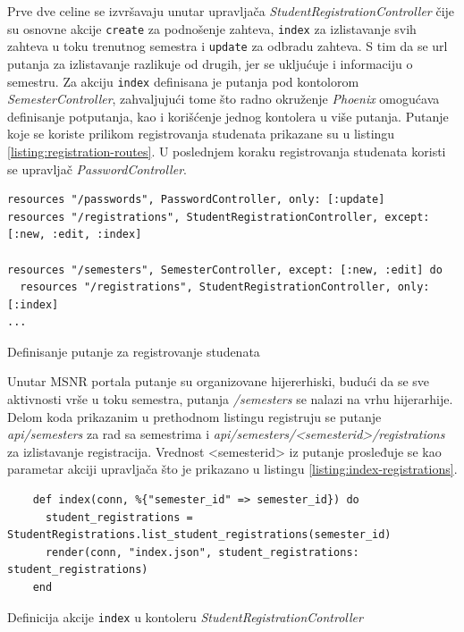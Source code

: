 \documentclass[12pt,oneside]{memoir}
\begin{document}
Prve dve celine se izvršavaju unutar upravljača \emph{StudentRegistrationController} čije su
osnovne akcije \texttt{create} za podnošenje zahteva, \texttt{index} za izlistavanje svih zahteva u toku
trenutnog semestra i \texttt{update} za odbradu zahteva. S tim da se url putanja za izlistavanje razlikuje od drugih,
jer se ukljućuje i informaciju o semestru. Za akciju \texttt{index} definisana je putanja pod kontolorom
\emph{SemesterController}, zahvaljujući tome što radno okruženje \emph{Phoenix} omogućava definisanje potputanja, kao i korišćenje jednog kontolera u više putanja.
Putanje koje se koriste prilikom registrovanja studenata prikazane su u listingu \ref{listing:registration-routes}.
U poslednjem koraku registrovanja studenata koristi se upravljač \emph{PasswordController}.
\begin{listing}[h]
\begin{verbatim}
resources "/passwords", PasswordController, only: [:update]
resources "/registrations", StudentRegistrationController, except: [:new, :edit, :index]

resources "/semesters", SemesterController, except: [:new, :edit] do
  resources "/registrations", StudentRegistrationController, only: [:index]
... 
\end{verbatim}
\caption{Definisanje putanje za registrovanje studenata}
\label{listing:registration-routes}
\end{listing}

Unutar MSNR portala putanje su organizovane hijererhiski, budući da se sve aktivnosti vrše u toku semestra,
putanja \emph{/semesters} se nalazi na vrhu hijerarhije. Delom koda prikazanim u prethodnom listingu registruju
se putanje \emph{api/semesters} za rad sa semestrima i \emph{api/semesters/<semester{\textunderscore}id>/registrations}
za izlistavanje registracija. Vrednost <semester{\textunderscore}id> iz putanje prosleđuje se kao parametar akciji
upravljača što je prikazano u listingu \ref{listing:index-registrations}.
\begin{listing}[h]
  \begin{verbatim}
    def index(conn, %{"semester_id" => semester_id}) do
      student_registrations = StudentRegistrations.list_student_registrations(semester_id)
      render(conn, "index.json", student_registrations: student_registrations)
    end
  \end{verbatim}
\caption{Definicija akcije \texttt{index} u kontoleru \emph{StudentRegistrationController}}
\label{listing:index-registrations}
\end{listing}
\end{document}

